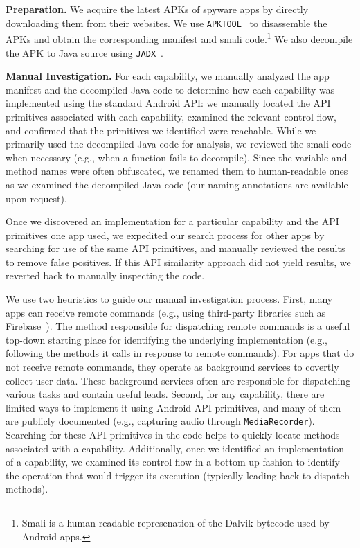 \textbf{Preparation.} We acquire the latest APKs of spyware apps by directly downloading them from their websites. We use \texttt{APKTOOL}~\cite{ApktoolA72:online} to disassemble the APKs and obtain the corresponding manifest and smali code.\footnote{Smali is a human-readable represenation of the Dalvik bytecode used by Android apps.} We also decompile the APK to Java source using \texttt{JADX}~\cite{skylotja9:online}.

\textbf{Manual Investigation.}
For each capability, we manually analyzed the app manifest and the decompiled Java code to determine how
each capability was implemented using the standard Android API: we manually located the API primitives associated with each capability, examined the relevant control flow, and confirmed that the primitives we identified were reachable. While we primarily used the decompiled Java code for
analysis, we reviewed the smali code when necessary (e.g., when a function fails
to decompile). Since the variable and method names were often obfuscated, we renamed them to human-readable ones as we examined the decompiled Java code (our naming annotations are available upon request).

Once we discovered an implementation for a particular capability and
the API primitives one app used, we expedited our search process
for other apps by searching for use of the same API primitives, and manually
reviewed the results to remove false positives. If this API similarity
approach did not yield results, we reverted back to manually
inspecting the code.

We use two heuristics to guide our manual investigation process.
First, many apps can receive remote commands (e.g., using third-party
libraries such as Firebase~\cite{Firebase21:online}).  The method
responsible for dispatching remote commands is a useful top-down
starting place for identifying the underlying implementation (e.g.,
following the methods it calls in response to remote commands).  For
apps that do not receive remote commands, they operate as background
services to covertly collect user data. These background services
often are responsible for dispatching various tasks and contain useful
leads. Second, for any capability, there are limited ways to implement
it using Android API primitives, and many of them are publicly
documented (e.g., capturing audio through \texttt{MediaRecorder}). Searching for these API primitives in the code helps to
quickly locate methods associated with a capability. Additionally,
once we identified an implementation of a capability, we examined its
control flow in a bottom-up fashion to identify the operation that
would trigger its execution (typically leading back to dispatch
methods).

